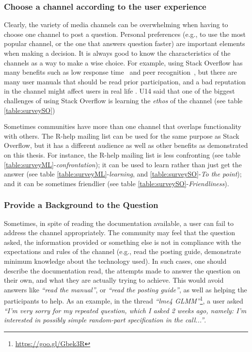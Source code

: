 \documentclass{sig-alternate-05-2015}
\begin{document}
	\subsubsection{Choose a channel according to the user experience}

		Clearly, the variety of media channels can be overwhelming when having to choose one channel to post a question.
		Personal preferences (e.g., to use the most popular channel, or the one that answers question faster) are important elements when making a decision.
		It is always good to know the characteristics of the channels as a way to make a wise choice.
		For example, using Stack Overflow has many benefits such as low response time~\cite{Mamykina2011} and peer recognition~\cite{Singer2013}, but there are many user manuals that should be read prior participation, and a bad reputation in the channel might affect users in real life \cite{Singer2013}.
		U14 said that one of the biggest challenges of using Stack Overflow is learning the \emph{ethos} of the channel (see table \ref{table:surveySO})

		Sometimes communities have more than one channel that overlaps functionality with others.
		The R-help mailing list can be used for the same purpose as Stack Overflow, but it has a different audience as well as other benefits as demonstrated on this thesis.
		For instance, the R-help mailing list is less confronting (see table \ref{table:surveyML}-\textit{confrontation}); it can be used to learn rather than just get the answer (see table \ref{table:surveyML}-\textit{learning}, and \ref{table:surveySO}-\textit{To the point}); and it can be sometimes friendlier (see table \ref{table:surveySO}-\textit{Friendliness}).

	\subsubsection{Provide a Background to the Question}

        Sometimes, in spite of reading the documentation available, a user can fail to address the channel appropriately. 
        The community may feel that the question asked, the information provided or something else is not in compliance with the expectations and rules of the channel (e.g., read the posting guide, demonstrate minimum knowledge about the technology used).
		In such cases, one should describe the documentation read, the attempts made to answer the question on their own, and what they are actually trying to achieve.
		This would avoid answers like \textit{``read the manual''}, or \textit{``read the posting guide''}, as well as helping the participants to help.
		As an example, in the thread \textit{``lme4 GLMM''}\footnote{\url{https://goo.gl/Gbek3R}}, a user asked \textit{``I'm very sorry for my repeated question, which I asked 2 weeks ago, namely: I'm interested in possibly simple random-part specification in the call...''}.
\end{document}
